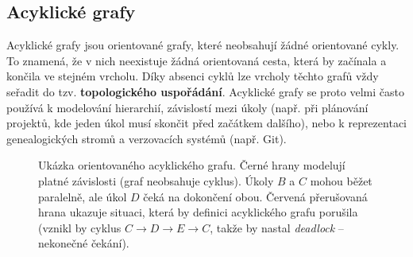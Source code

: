 \subsection{Acyklické grafy}
Acyklické grafy jsou orientované grafy, které neobsahují žádné orientované cykly. To znamená, že v nich neexistuje žádná orientovaná cesta, která by začínala a končila ve stejném vrcholu. 
Díky absenci cyklů lze vrcholy těchto grafů vždy seřadit do tzv. \textbf{topologického uspořádání}. Acyklické grafy se proto velmi často používá k modelování hierarchií, závislostí mezi úkoly (např. při plánování projektů, kde jeden úkol musí skončit před začátkem dalšího), nebo k reprezentaci genealogických stromů a verzovacích systémů (např. Git).

\begin{figure}[htbp]
    \centering
    \caption{Ukázka orientovaného acyklického grafu. Černé hrany modelují platné závislosti (graf neobsahuje cyklus). Úkoly $B$ a $C$ mohou běžet paralelně, ale úkol $D$ čeká na dokončení obou. Červená přerušovaná hrana ukazuje situaci, která by definici acyklického grafu porušila (vznikl by cyklus $C \to D \to E \to C$, takže by nastal \textit{deadlock} – nekonečné čekání).}
    \label{fig:dag_ukazka}
\end{figure}

